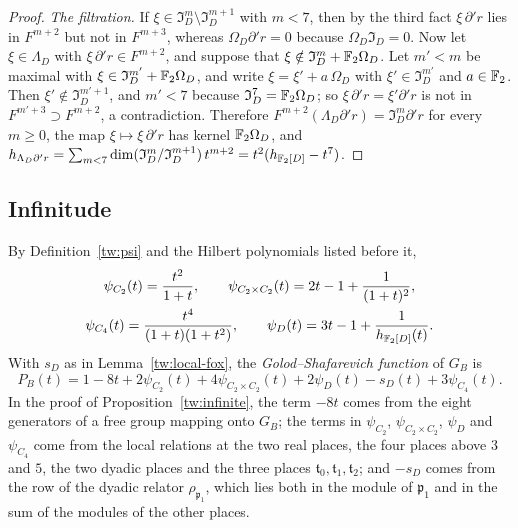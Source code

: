 \begin{proof}
\emph{The filtration.} If $\xi\in\mathfrak I_D^m\setminus\mathfrak I_D^{m+1}$
with $m<7$, then by the third fact $\xi\,\partial'r$ lies in $F^{m+2}$ but not
in $F^{m+3}$, whereas $\Omega_D\partial'r=0$ because $\Omega_D\mathfrak I_D=0$.
Now let $\xi\in\Lambda_D$ with $\xi\,\partial'r\in F^{m+2}$, and suppose that
$\xi\notin\mathfrak I_D^m+\mathbb F_2\Omega_D$. Let $m'<m$ be maximal with
$\xi\in\mathfrak I_D^{m'}+\mathbb F_2\Omega_D$, and write $\xi=\xi'+a\,\Omega_D$
with $\xi'\in\mathfrak I_D^{m'}$ and $a\in\mathbb F_2$. Then
$\xi'\notin\mathfrak I_D^{m'+1}$, and $m'<7$ because
$\mathfrak I_D^7=\mathbb F_2\Omega_D$; so $\xi\,\partial'r=\xi'\partial'r$ is not in
$F^{m'+3}\supset F^{m+2}$, a contradiction. Therefore
$F^{m+2}(\Lambda_D\partial'r)=\mathfrak I_D^m\partial'r$ for every $m\ge0$,
the map $\xi\mapsto\xi\,\partial'r$ has kernel $\mathbb F_2\Omega_D$, and
$h_{\Lambda_D\partial'r}=\sum_{m<7}\dim(\mathfrak I_D^m/\mathfrak I_D^{m+1})\,t^{m+2}=t^2(h_{\mathbb F_2[D]}-t^7)$.
\end{proof}

\subsection{Infinitude}\label{tw:infinite-section}
By Definition~\ref{tw:psi} and the Hilbert polynomials listed before it,
\begin{equation}\label{tw:costs}
\begin{gathered}
 \psi_{C_2}(t)=\frac{t^2}{1+t},\qquad
 \psi_{C_2\times C_2}(t)=2t-1+\frac1{(1+t)^2},\\
 \psi_{C_4}(t)=\frac{t^4}{(1+t)(1+t^2)},\qquad
 \psi_D(t)=3t-1+\frac1{h_{\mathbb F_2[D]}(t)}.
\end{gathered}
\end{equation}
With $s_D$ as in Lemma~\ref{tw:local-fox}, the \emph{Golod--Shafarevich
function} of $G_B$ is
\begin{equation}\label{tw:PB}
 P_B(t)=1-8t+2\psi_{C_2}(t)+4\psi_{C_2\times C_2}(t)+2\psi_D(t)-s_D(t)
 +3\psi_{C_4}(t).
\end{equation}
In the proof of Proposition~\ref{tw:infinite}, the term $-8t$ comes from the
eight generators of a free group mapping onto $G_B$; the terms in
$\psi_{C_2}$, $\psi_{C_2\times C_2}$, $\psi_D$ and $\psi_{C_4}$ come from the
local relations at the two real places, the four places above $3$ and $5$,
the two dyadic places and the three places
$\mathfrak t_0,\mathfrak t_1,\mathfrak t_2$; and $-s_D$ comes from the row of
the dyadic relator $\rho_{\mathfrak p_1}$, which lies both in the module of
$\mathfrak p_1$ and in the sum of the modules of the other places.

